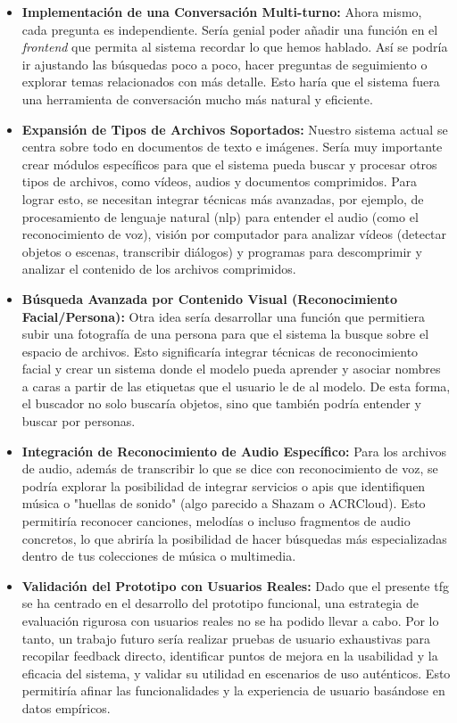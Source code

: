 \begin{itemize}
\item \textbf{Implementación de una Conversación Multi-turno:} Ahora mismo, cada pregunta es independiente. Sería genial poder añadir una función en el \textit{frontend} que permita al sistema recordar lo que hemos hablado. Así se podría ir ajustando las búsquedas poco a poco, hacer preguntas de seguimiento o explorar temas relacionados con más detalle. Esto haría que el sistema fuera una herramienta de conversación mucho más natural y eficiente.
\item \textbf{Expansión de Tipos de Archivos Soportados:} Nuestro sistema actual se centra sobre todo en documentos de texto e imágenes. Sería muy importante crear módulos específicos para que el sistema pueda buscar y procesar otros tipos de archivos, como vídeos, audios y documentos comprimidos. Para lograr esto, se necesitan integrar técnicas más avanzadas, por ejemplo, de procesamiento de lenguaje natural (\gls{nlp}) para entender el audio (como el reconocimiento de voz), visión por computador para analizar vídeos (detectar objetos o escenas, transcribir diálogos) y programas para descomprimir y analizar el contenido de los archivos comprimidos.
\item \textbf{Búsqueda Avanzada por Contenido Visual (Reconocimiento Facial/Persona):} Otra idea sería desarrollar una función que permitiera subir una fotografía de una persona para que el sistema la busque sobre el espacio de archivos. Esto significaría integrar técnicas de reconocimiento facial y crear un sistema donde el modelo pueda aprender y asociar nombres a caras a partir de las etiquetas que el usuario le de al modelo. De esta forma, el buscador no solo buscaría objetos, sino que también podría entender y buscar por personas.
\item \textbf{Integración de Reconocimiento de Audio Específico:} Para los archivos de audio, además de transcribir lo que se dice con reconocimiento de voz, se podría explorar la posibilidad de integrar servicios o \gls{api}s que identifiquen música o "huellas de sonido" (algo parecido a Shazam o ACRCloud). Esto permitiría reconocer canciones, melodías o incluso fragmentos de audio concretos, lo que abriría la posibilidad de hacer búsquedas más especializadas dentro de tus colecciones de música o multimedia.
\item \textbf{Validación del Prototipo con Usuarios Reales:} Dado que el presente \gls{tfg} se ha centrado en el desarrollo del prototipo funcional, una estrategia de evaluación rigurosa con usuarios reales no se ha podido llevar a cabo. Por lo tanto, un trabajo futuro sería realizar pruebas de usuario exhaustivas para recopilar feedback directo, identificar puntos de mejora en la usabilidad y la eficacia del sistema, y validar su utilidad en escenarios de uso auténticos. Esto permitiría afinar las funcionalidades y la experiencia de usuario basándose en datos empíricos.
\end{itemize}

